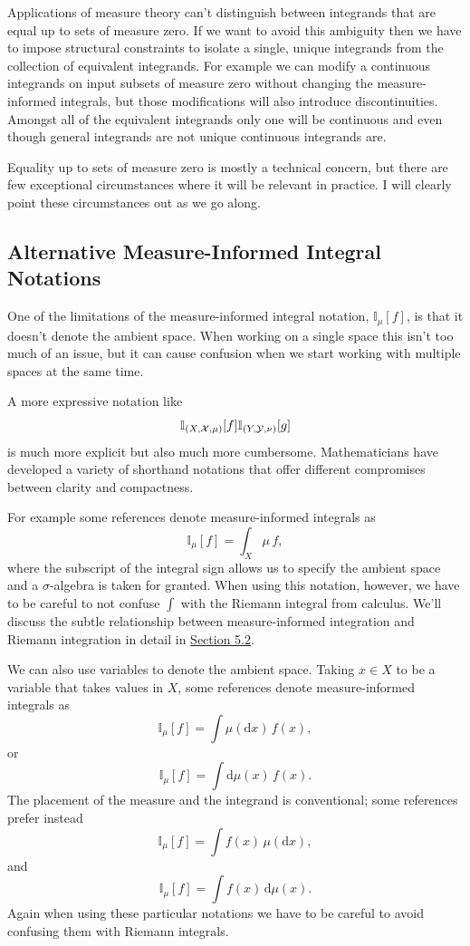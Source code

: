 \documentclass[
  letterpaper,
  DIV=11,
  numbers=noendperiod]{scrartcl}
\begin{document}
Applications of measure theory can't distinguish between integrands that
are equal up to sets of measure zero. If we want to avoid this ambiguity
then we have to impose structural constraints to isolate a single,
unique integrands from the collection of equivalent integrands. For
example we can modify a continuous integrands on input subsets of
measure zero without changing the measure-informed integrals, but those
modifications will also introduce discontinuities. Amongst all of the
equivalent integrands only one will be continuous and even though
general integrands are not unique continuous integrands are.

Equality up to sets of measure zero is mostly a technical concern, but
there are few exceptional circumstances where it will be relevant in
practice. I will clearly point these circumstances out as we go along.

\hypertarget{sec:alt_notations}{%
\subsection{Alternative Measure-Informed Integral
Notations}\label{sec:alt_notations}}

One of the limitations of the measure-informed integral notation,
\(\mathbb{I}_{\mu}[f]\), is that it doesn't denote the ambient space.
When working on a single space this isn't too much of an issue, but it
can cause confusion when we start working with multiple spaces at the
same time.

A more expressive notation like \[
\mathbb{I}_{(X, \mathcal{X}, \mu)}[f]
\\
\mathbb{I}_{(Y, \mathcal{Y}, \nu)}[g]
\] is much more explicit but also much more cumbersome. Mathematicians
have developed a variety of shorthand notations that offer different
compromises between clarity and compactness.

For example some references denote measure-informed integrals as \[
\mathbb{I}_{\mu}[f] = \int_{X} \mu \, f,
\] where the subscript of the integral sign allows us to specify the
ambient space and a \(\sigma\)-algebra is taken for granted. When using
this notation, however, we have to be careful to not confuse \(\int\)
with the Riemann integral from calculus. We'll discuss the subtle
relationship between measure-informed integration and Riemann
integration in detail in \href{@sec:integration_on_R}{Section 5.2}.

We can also use variables to denote the ambient space. Taking
\(x \in X\) to be a variable that takes values in \(X\), some references
denote measure-informed integrals as \[
\mathbb{I}_{\mu}[f] = \int \mu(\mathrm{d} x) \, f(x),
\] or \[
\mathbb{I}_{\mu}[f] = \int \mathrm{d} \mu(x) \, f(x).
\] The placement of the measure and the integrand is conventional; some
references prefer instead \[
\mathbb{I}_{\mu}[f] = \int f(x) \, \mu(\mathrm{d} x),
\] and \[
\mathbb{I}_{\mu}[f] = \int f(x) \, \mathrm{d} \mu(x).
\] Again when using these particular notations we have to be careful to
avoid confusing them with Riemann integrals.
\end{document}
